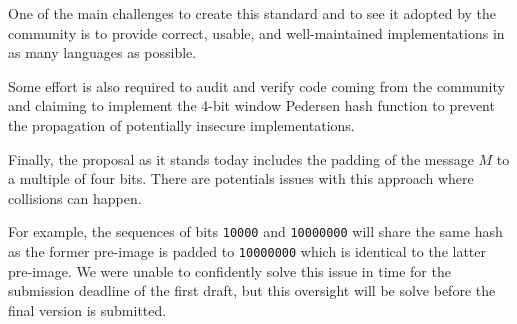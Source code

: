 One of the main challenges to create this standard and to see it adopted by the community is
to provide correct, usable, and well-maintained implementations in as many languages as possible.

Some effort is also required to audit and verify code coming from the community
and claiming to implement the 4-bit window Pedersen hash function
to prevent the propagation of potentially insecure implementations.

Finally, the proposal as it stands today includes the padding of the message $M$ to a multiple of four bits.
There are potentials issues with this approach where collisions can happen.

For example, the sequences of bits \texttt{10000} and \texttt{10000000} will share the same hash
as the former pre-image is padded to \texttt{10000000} which is identical to the latter pre-image.
We were unable to confidently solve this issue in time for the submission deadline of the first draft,
but this oversight will be solve before the final version is submitted.



